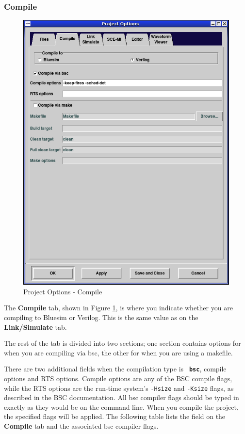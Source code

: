 \documentclass{article}
\newcommand{\te}[1]{\texttt{#1}}
\begin{document}

\subsubsection{Compile}
\label{compiler-options}

\begin{figure}[ht]
\begin{center}
\includegraphics[width = 3 in]{figures/options-compile}
\caption{Project Options - Compile}
\label{fig-compiler1}
\end{center}
\end{figure}

The {\bf Compile} tab, shown in Figure \ref{fig-compiler1},  is where you indicate whether you are compiling
to Bluesim or Verilog.  This is the same value as on the  {\bf Link/Simulate}
tab.

The rest of the tab is divided into two sections; one section
contains options for when you are compiling via bsc, the other for when
you are using a makefile.

There are two additional fields when the compilation type is {\bf\tt
bsc}, compile options and RTS options.  Compile options are any of the
BSC compile flags, while the RTS options are the run-time system's
 \te{-Hsize} and \te{-Ksize} flags, as described in the BSC documentation.
All bsc compiler flags
should be typed in exactly as they would be on the command line.  When
you compile the project, the specified flags will be applied.
The following
table lists the field on the {\bf Compile} tab and the associated bsc
compiler flags.
\end{document}
